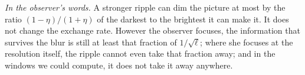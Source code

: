 \emph{In the observer's words.}
A stronger ripple can dim the picture at most by the ratio $(1-\eta)/(1+\eta)$ of the darkest to the brightest it can make it.
It does not change the exchange rate.
However the observer focuses, the information that survives the blur is still at least that fraction of $1/\sqrt\ell$; where she focuses at the resolution itself, the ripple cannot even take that fraction away; and in the windows we could compute, it does not take it away anywhere.
